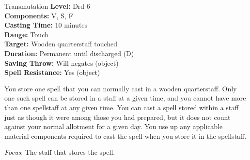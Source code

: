 {Transmutation}
{
	\textbf{Level:}
	Drd 6\\
	\textbf{Components:}
	V, S, F\\
	\textbf{Casting Time:}
	10 minutes\\
	\textbf{Range:}
	Touch\\
	\textbf{Target:}
	Wooden quarterstaff touched\\
	\textbf{Duration:}
	Permanent until discharged (D)\\
	\textbf{Saving Throw:}
	Will negates (object)\\
	\textbf{Spell Resistance:}
	Yes (object)\\
}
{
	You store one spell that you can normally cast in a wooden quarterstaff. Only one such spell can be stored in a staff at a given time, and you cannot have more than one spellstaff at any given time. You can cast a spell stored within a staff just as though it were among those you had prepared, but it does not count against your normal allotment for a given day. You use up any applicable material components required to cast the spell when you store it in the spellstaff.

	\textit{Focus}:
	The staff that stores the spell.

}
